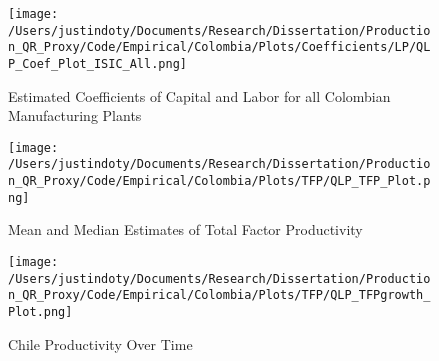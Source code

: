 \documentclass[11pt]{article}
\begin{document}
\begin{figure}[H]
\centering
\caption{Estimated Coefficients of Capital and Labor for all Colombian Manufacturing Plants}
\texttt{[image: /Users/justindoty/Documents/Research/Dissertation/Production\_QR\_Proxy/Code/Empirical/Colombia/Plots/Coefficients/LP/QLP\_Coef\_Plot\_ISIC\_All.png]}
\label{fig:LPCOLall}
\end{figure}

\begin{figure}[H]
\centering
\caption{Mean and Median Estimates of Total Factor Productivity}
\texttt{[image: /Users/justindoty/Documents/Research/Dissertation/Production\_QR\_Proxy/Code/Empirical/Colombia/Plots/TFP/QLP\_TFP\_Plot.png]}
\label{fig:LPTFPDens}
\end{figure}

\begin{figure}[H]
\centering
\caption{Chile Productivity Over Time}
\texttt{[image: /Users/justindoty/Documents/Research/Dissertation/Production\_QR\_Proxy/Code/Empirical/Colombia/Plots/TFP/QLP\_TFPgrowth\_Plot.png]}
\label{fig:LPCHLpgrowth}
\end{figure}
\end{document}
